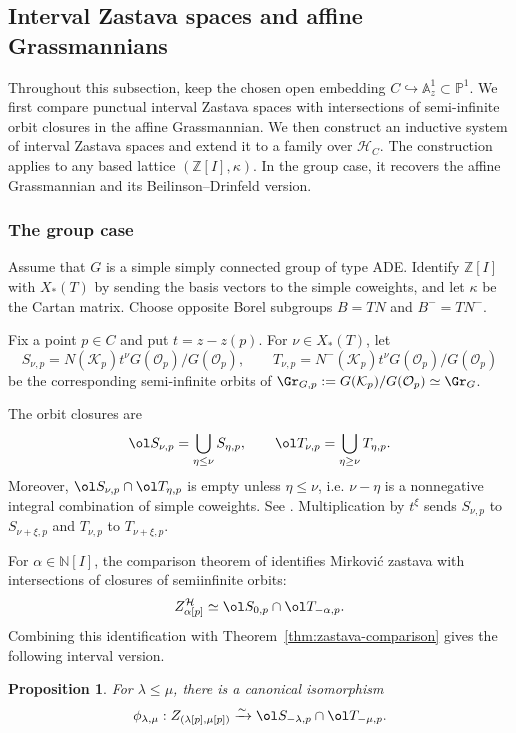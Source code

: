 \documentclass{amsart}
\numberwithin{equation}{section}
\numberwithin{figure}{section}
\newtheorem{prop}[thm]{Proposition}
\theoremstyle{definition}
\theoremstyle{remark}
\renewcommand{\c}[1]{\mathcal{#1}}
\renewcommand{\b}[1]{\mathbb{#1}}
\begin{document}
\subsection{Interval Zastava spaces and affine Grassmannians}
\label{subsec:interval-grassmannian}

Throughout this subsection, keep the chosen open embedding
$C\hookrightarrow\b A^1_z\subset\b P^1$.
We first compare punctual interval Zastava spaces with
intersections of semi-infinite orbit closures in the
affine Grassmannian.
We then construct an inductive system of interval
Zastava spaces and extend it to a family over $\c H_C$.
The construction applies to any based lattice
$(\b Z[I],\kappa)$. In the group case, it recovers the
affine Grassmannian and its Beilinson--Drinfeld version. 

\subsubsection{The group case}
\label{zastavagroup}

Assume that $G$ is a simple simply connected group of
type ADE.
Identify $\b Z[I]$ with $X_*(T)$ by sending the basis
vectors to the simple coweights, and let $\kappa$ be the
Cartan matrix. Choose opposite Borel subgroups $B=TN$ and $B^-=TN^-$.

Fix a point $p\in C$ and put $t=z-z(p)$.
For $\nu\in X_*(T)$, let
\[
S_{\nu,p}=N(\c K_p)t^\nu G(\c O_p)/G(\c O_p),
\qquad
T_{\nu,p}=N^-(\c K_p)t^\nu G(\c O_p)/G(\c O_p)
\]
be the corresponding semi-infinite orbits of $\Gr_{G,p}:=G(\c K_p)/G(\c O_p)\simeq \Gr_G$.

The orbit closures are
\[
\ol S_{\nu,p}=\bigcup_{\eta\leq\nu}S_{\eta,p},
\qquad
\ol T_{\nu,p}=\bigcup_{\eta\geq\nu}T_{\eta,p}.
\]
Moreover, $\ol S_{\nu,p}\cap\ol T_{\eta,p}$ is empty
unless $\eta\leq\nu$, i.e. $\nu-\eta$ is a
nonnegative integral combination of simple coweights. See \cite{mirkovic2007geometric}.
Multiplication by $t^\xi$ sends $S_{\nu,p}$ to
$S_{\nu+\xi,p}$ and $T_{\nu,p}$ to $T_{\nu+\xi,p}$.

For $\alpha\in\b N[I]$, the comparison theorem
of \cite[\S2.4.6]{mirkovic2021loop} identifies Mirkovi\'c zastava with intersections of closures of semiinfinite orbits:
\[
Z^{\c H}_{\alpha[p]}
\simeq
\ol S_{0,p}\cap\ol T_{-\alpha,p}.
\]
Combining this identification with
Theorem~\ref{thm:zastava-comparison} gives the
following interval version.

\begin{prop}
	\label{prop:interval-zastava-grassmannian}
	For $\lambda\leq\mu$, there is a canonical isomorphism
	\[
	\phi_{\lambda,\mu}:
	Z_{(\lambda[p],\mu[p])}
	\xrightarrow{\sim}
	\ol S_{-\lambda,p}\cap\ol T_{-\mu,p}.
	\]
\end{prop}
\end{document}

